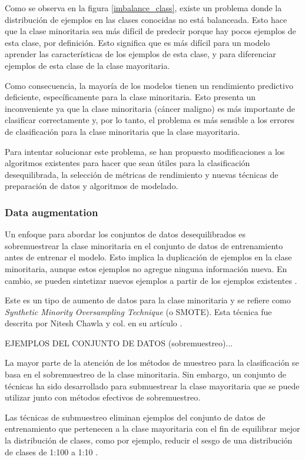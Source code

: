 Como se observa en la figura \ref{imbalance_class}, existe un problema donde la distribución de ejemplos en las clases conocidas no está balanceada. Esto hace que la clase minoritaria sea más difícil de predecir porque hay pocos ejemplos de esta clase, por definición. Esto significa que es más difícil para un modelo aprender las características de los ejemplos de esta clase, y para diferenciar ejemplos de esta clase de la clase mayoritaria.

Como consecuencia, la mayoría de los modelos tienen un rendimiento predictivo deficiente, específicamente para la clase minoritaria. Esto presenta un inconveniente ya que la clase minoritaria (cáncer maligno) es más importante de clasificar correctamente y, por lo tanto, el problema es más sensible a los errores de clasificación para la clase minoritaria que la clase mayoritaria.


Para intentar solucionar este problema, se han propuesto modificaciones a los algoritmos existentes para hacer que sean útiles para la clasificación desequilibrada, la selección de métricas de rendimiento y nuevas técnicas de preparación de datos y algoritmos de modelado.

\subsubsection{Data augmentation}
Un enfoque para abordar los conjuntos de datos desequilibrados es sobremuestrear la clase minoritaria en el conjunto de datos de entrenamiento antes de entrenar el modelo. Esto implica la duplicación de ejemplos en la clase minoritaria, aunque estos ejemplos no agregue ninguna información nueva. En cambio, se pueden sintetizar nuevos ejemplos a partir de los ejemplos existentes \cite{imbalanced-classification}. 

Este es un tipo de aumento de datos para la clase minoritaria y se refiere como \emph{Synthetic Minority Oversampling Technique} (o SMOTE). Esta técnica fue descrita por Nitesh Chawla y col. en su artículo \cite{SMOTE}.

EJEMPLOS DEL CONJUNTO DE DATOS (sobremuestreo)...

La mayor parte de la atención de los métodos de muestreo para la clasificación se basa en el sobremuestreo de la clase minoritaria. Sin embargo, un conjunto de técnicas ha sido desarrollado para submuestrear la clase mayoritaria que se puede utilizar junto con métodos efectivos de sobremuestreo.

Las técnicas de submuestreo eliminan ejemplos del conjunto de datos de entrenamiento que pertenecen a la clase mayoritaria con el fin de equilibrar mejor la distribución de clases, como por ejemplo, reducir el sesgo de una distribución de clases de 1:100 a 1:10 \cite{imbalanced-classification}. 

